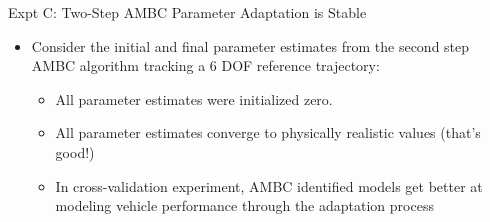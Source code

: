 \begin{frame}{Expt C: Two-Step AMBC Parameter Adaptation is Stable}


\begin{itemize}
\item<1->Consider the initial and final parameter estimates from the second step AMBC
  algorithm tracking a 6 DOF reference trajectory:
\begin{itemize}
\item<2->All parameter estimates were initialized zero.
\item<3->All parameter estimates converge to physically realistic values (that's good!)
\item<4->In cross-validation experiment, AMBC identified models get better at
  modeling vehicle performance through the adaptation process
\end{itemize}
\end{itemize}


\end{frame}
